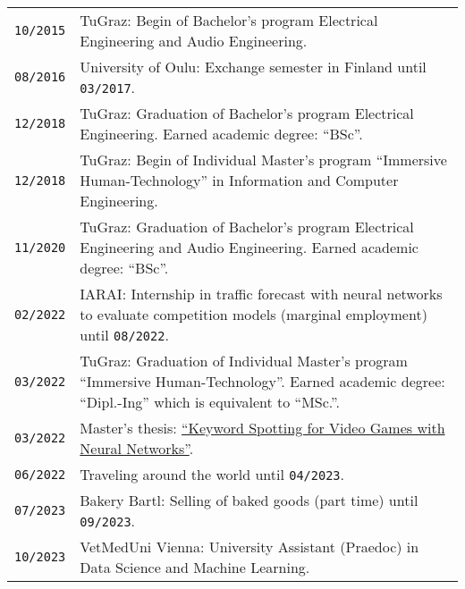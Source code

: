 {\begin{tabularx}{\columnwidth}{>{\centering\arraybackslash}p{1.5cm} | p{12cm}}
  \texttt{10/2015} & TuGraz: Begin of Bachelor's program Electrical Engineering and Audio Engineering.\\
  \texttt{08/2016} & University of Oulu: Exchange semester in Finland until \texttt{03/2017}.\\
  \texttt{12/2018} & TuGraz: Graduation of Bachelor's program Electrical Engineering. Earned academic degree: \enquote{BSc}.\\
  \texttt{12/2018} & TuGraz: Begin of Individual Master's program \enquote{Immersive Human-Technology} in Information and Computer Engineering.\\
  \texttt{11/2020} & TuGraz: Graduation of Bachelor's program Electrical Engineering and Audio Engineering. Earned academic degree: \enquote{BSc}.\\
  \texttt{02/2022} & IARAI: Internship in traffic forecast with neural networks to evaluate competition models (marginal employment) until \texttt{08/2022}.\\
  \texttt{03/2022} & TuGraz: Graduation of Individual Master's program \enquote{Immersive Human-Technology}. Earned academic degree: \enquote{Dipl.-Ing} which is equivalent to \enquote{MSc.}.\\
  \texttt{03/2022} & Master's thesis: \href{https://github.com/chrisworld/kws_game}{\enquote{Keyword Spotting for Video Games with Neural Networks}}.\\
  \texttt{06/2022} & Traveling around the world until \texttt{04/2023}.\\
  \texttt{07/2023} & Bakery Bartl: Selling of baked goods (part time) until \texttt{09/2023}.\\
  \texttt{10/2023} & VetMedUni Vienna: University Assistant (Praedoc) in Data Science and Machine Learning.\\
\end{tabularx}
}
